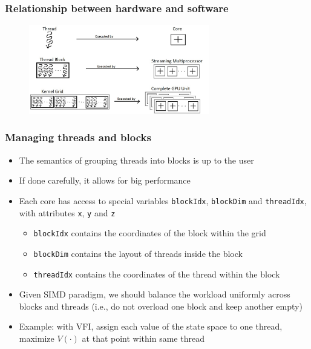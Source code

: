 \documentclass[10pt, aspectratio=1610]{beamer}
\begin{document}
\begin{frame}
  \frametitle{Relationship between hardware and software}

  \begin{figure}
    \centering
    \includegraphics[width=0.7\textwidth, height=0.8\textheight, keepaspectratio]{./img/hw-sw-thread_block.jpg}
  \end{figure}

\end{frame}

\begin{frame}
  \frametitle{Managing threads and blocks}

  \begin{itemize}
    \item The semantics of grouping threads into blocks is up to the user
    \item If done carefully, it allows for big performance
    \item Each core has access to special variables \texttt{blockIdx}, \texttt{blockDim} and \texttt{threadIdx}, with attributes \texttt{x}, \texttt{y} and \texttt{z}
      \begin{itemize}
        \item \texttt{blockIdx} contains the coordinates of the block within the grid
        \item \texttt{blockDim} contains the layout of threads inside the block
        \item \texttt{threadIdx} contains the coordinates of the thread within the block
      \end{itemize}
    \item Given SIMD paradigm, we should balance the workload uniformly across blocks and threads (i.e., do not overload one block and keep another empty)

    \vfill

    \item Example: with VFI, assign each value of the state space to one thread, maximize $V(\cdot)$ at that point within same thread
  \end{itemize}

\end{frame}
\end{document}
